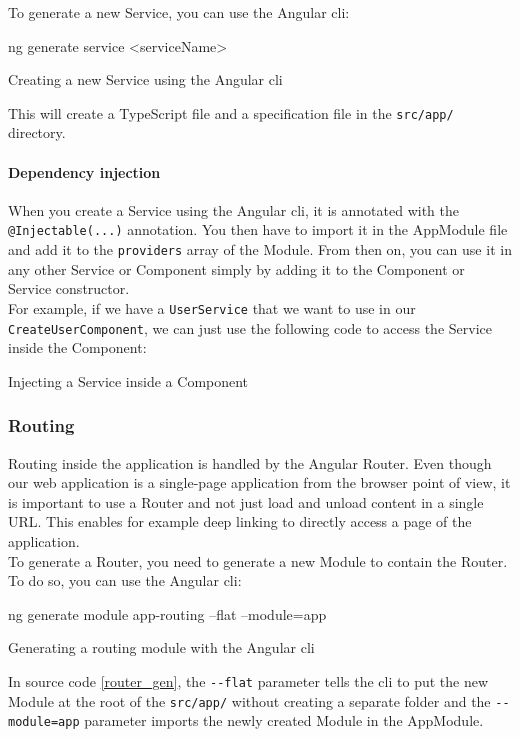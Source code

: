 \documentclass[twoside, openright,11pt,a4paper]{book}
\newenvironment{code}{\captionsetup{type=listing}}{}
\begin{document}
To generate a new Service, you can use the Angular \gls{cli}:
\begin{code}
\begin{shell}
ng generate service <serviceName>
\end{shell}
	\caption{Creating a new Service using the Angular \gls{cli}}
\end{code}
This will create a TypeScript file and a specification file in the \verb+src/app/+ directory. 
\paragraph{Dependency injection}
\label{dependency_injection}
When you create a Service using the Angular \gls{cli}, it is annotated with the \verb+@Injectable(...)+ annotation. You then have to import it in the AppModule file and add it to the \verb+providers+ array of the Module. From then on, you can use it in any other Service or Component simply by adding it to the Component or Service constructor. \\

For example, if we have a \verb+UserService+ that we want to use in our \verb+CreateUserComponent+, we can just use the following code to access the Service inside the Component:
\begin{code}
	\caption{Injecting a Service inside a Component}
\end{code}
\subsubsection{Routing}
Routing\cite{angular:doc:router} inside the application is handled by the Angular Router. Even though our web application is a single-page application from the browser point of view, it is important to use a Router and not just load and unload content in a single URL. This enables for example deep linking to directly access a page of the application. \\

To generate a Router, you need to generate a new Module to contain the Router. To do so, you can use the Angular \gls{cli}:
\begin{code}
	\begin{shell}
ng generate module app-routing --flat --module=app
	\end{shell}
	\caption{Generating a routing module with the Angular \gls{cli}}
	\label{router_gen}
\end{code}
In source code \ref{router_gen}, the \verb+--flat+ parameter tells the \gls{cli} to put the new Module at the root of the \verb+src/app/+ without creating a separate folder and the \verb+--module=app+ parameter imports the newly created Module in the AppModule. \\
\end{document}
